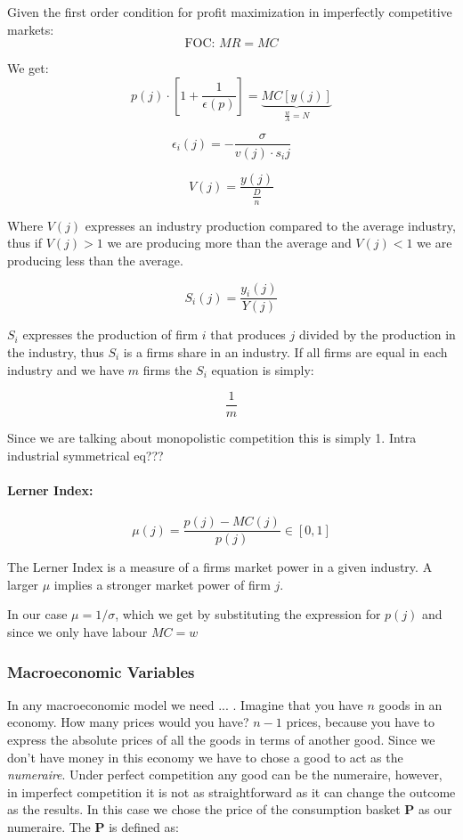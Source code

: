 Given the first order condition for profit maximization in imperfectly competitive markets:
$$
\text{FOC: } MR = MC
$$

We get:
$$
p ( j ) \cdot \left[ 1 + \frac { 1 } { \epsilon ( p ) } \right] = \underbrace{MC \left[ y(j) \right]}_{\frac{w}{A} = N}
$$

$$
\epsilon_i (j) = - \frac{\sigma}{v(j) \cdot s_ij}
$$

$$
V(j) = \frac{y(j)}{\frac{D}{n}}
$$

Where $V(j)$ expresses an industry production compared to the average industry, thus if $V(j) > 1 $ we are producing more than the average and $V(j) < 1 $ we are producing less than the average.  

$$
S_i (j) = \frac{y_i(j)}{Y(j)}
$$

$S_i$ expresses the production of firm $i$ that produces $j$ divided by the production in the industry, thus $S_i$ is a firms share in an industry. If all firms are equal in each industry and we have $m$ firms the $S_i$ equation is simply:

$$
\frac{1}{m}
$$

Since we are talking about monopolistic competition this is simply 1. Intra industrial symmetrical eq???


\paragraph{Lerner Index:}

$$
\mu(j) = \frac{p(j) - MC(j) }{p(j)} \in \left[ 0,1 \right]
$$

The Lerner Index is a measure of a firms market power in a given industry. A larger $\mu$ implies a stronger market power of firm $j$.

In our case $\mu = 1/\sigma$, which we get by substituting the expression for $p(j)$ and since we only have labour $MC = w$

\subsubsection*{Macroeconomic Variables}

In any macroeconomic model we need ... . Imagine that you have $n$ goods in an economy. How many prices would you have? $n - 1$ prices, because you have to express the absolute prices of all the goods in terms of another good. Since we don't have money in this economy we have to chose a good to act as the \textit{numeraire}. Under perfect competition any good can be the numeraire, however, in imperfect competition it is not as straightforward as it can change the outcome as the results. In this case we chose the price of the consumption basket $\mathbf{P}$ as our numeraire. The $\mathbf{P}$ is defined as:

